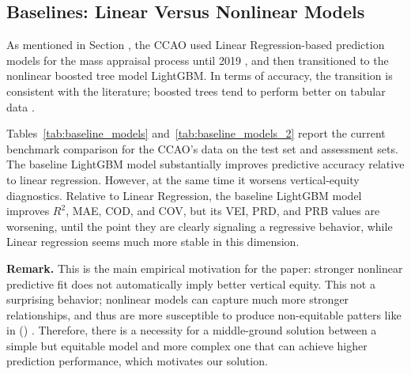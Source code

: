 \documentclass[12pt, draft]{article}
\theoremstyle{plain}
\theoremstyle{definition}
\newcommand{\1}{\mathbf{1}}
\begin{document}
\subsection{Baselines: Linear Versus Nonlinear Models}

As mentioned in Section , the CCAO used Linear Regression-based prediction models for the mass appraisal process until 2019 , and then transitioned to the nonlinear boosted tree model LightGBM. In terms of accuracy, the transition is consistent with the literature; boosted trees tend to perform better on tabular data .

Tables~\ref{tab:baseline_models} and~\ref{tab:baseline_models_2} report the current benchmark comparison for the CCAO's data on the test set and assessment sets. The baseline LightGBM model substantially improves predictive accuracy relative to linear regression. However, at the same time it worsens vertical-equity diagnostics. Relative to Linear Regression, the baseline LightGBM model improves \(R^2\), MAE, COD, and COV, but its VEI, PRD, and PRB values are worsening, until the point they are clearly signaling a regressive behavior, while Linear regression seems much more stable in this dimension.

\medskip

\noindent \textbf{Remark.} This is the main empirical motivation for the paper: stronger nonlinear predictive fit does not automatically imply better vertical equity. This not a surprising behavior; nonlinear models can capture much more stronger relationships, and thus are more susceptible to produce non-equitable patters like in (\label{eq:covariance_population_identity}) . Therefore, there is a necessity for a middle-ground solution between a simple but equitable model and more complex one that can achieve higher prediction performance, which motivates our solution.

\begin{table}[!ht]
\centering
\caption{Baseline comparison on the \textit{test} set ($\sim$2023). Lower is better for MAE, COD, and COV. For PRD, values closer to one are preferred; for VEI and PRB, values closer to zero are preferred.}
\label{tab:baseline_models}
\end{table}
\end{document}
